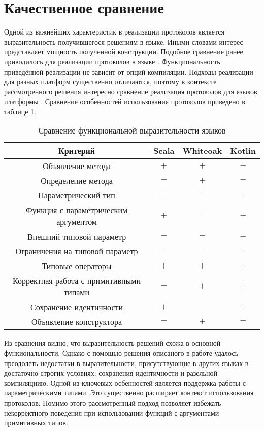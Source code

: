 \section{Качественное сравнение}
Одной из важнейших характеристик в реализации протоколов является выразительность получившегося решениям в языке. Иными словами интерес представляет мощность полученной конструкции. Подобное сравнение ранее приводилось для реализации протоколов в языке \cite{whiteoak}. Функциональность приведённой реализации не зависит от опций компиляции. Подходы реализации для разных платформ существенно отличаются, поэтому в контексте рассмотренного решения интересно сравнение реализация протоколов для языков платформы . Сравнение особенностей использования протоколов приведено в таблице \ref{features_comparison}.

\begin{table}[htb]
  \begin{center}
    \begin{tabular}{|c|c|c|c|} \hline
      Критерий & Scala & Whiteoak & Kotlin \\ \hline
      Объявление метода & $+$ & $+$ & $+$ \\ \hline
      Определение метода & $-$ & $+$ & $-$ \\ \hline
      Параметрический тип & $-$ & $-$ & $+$ \\ \hline
      Функция с параметрическим аргументом & $+$ & $-$ & $+$ \\ \hline
      Внешний типовой параметр & $-$ & $-$ & $+$ \\ \hline
      Ограничения на типовой параметр & $-$ & $-$ & $+$ \\ \hline
      Типовые операторы & $+$ & $+$ & $+$ \\ \hline
      Корректная работа с примитивными типами & $-$ & $+$ & $+$ \\ \hline
      Сохранение идентичности & $+$ & $-$ & $+$ \\ \hline
      Объявление конструктора & $-$ & $+$ & $-$ \\ \hline
    \end{tabular}
    \caption{Сравнение функциональной выразительности языков}
    \label{features_comparison}
  \end{center}
\end{table}

Из сравнения видно, что выразительность решений схожа в основной функиональности. Однако с помощью решения описаного в работе удалось преодолеть недостатки в выразительности, присутствующие в других языках в достаточно строгих условиях: сохранения идентичности и разельной компиляциию. Одной из ключевых осбенностей является поддержка работы с параметрическими типами. Это существенно расширяет контекст использования протоколов. Помимо этого рассмотренный подход позволяет избежать некорректного поведения при использовании функций с аргументами примитивных типов.

